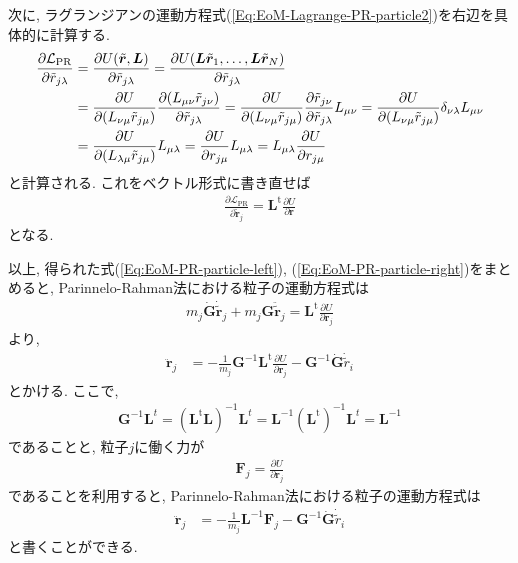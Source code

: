 次に, ラグランジアンの運動方程式(\ref{Eq:EoM-Lagrange-PR-particle2})を右辺を具体的に計算する.
\begin{align}
  \frac{\partial \mathcal{L}_{\mathrm{PR}}}
  {\partial \tilde{r}_{j \lambda}}
&=
\frac{\partial U(\tilde{\bm{r}}, \bm{L})}{\partial \tilde{r}_{j \lambda}}
=
\frac{\partial U (\bm{L}\tilde{\bm{r}}_{1}, \ldots, \bm{L}\tilde{\bm{r}}_{N})}
     {\partial \tilde{r}_{j \lambda}}
\notag \\
&=
\frac{\partial U}{\partial (L_{\nu\mu} \tilde{r}_{j\mu})}
\frac{\partial (L_{\mu\nu} \tilde{r}_{j\nu})}{\partial \tilde{r}_{j \lambda}}
=
\frac{\partial U}{\partial (L_{\nu\mu} \tilde{r}_{j\mu})}
\frac{\partial \tilde{r}_{j\nu}}{\partial \tilde{r}_{j \lambda}}
L_{\mu\nu}
=
\frac{\partial U}{\partial (L_{\nu\mu} \tilde{r}_{j\mu})}
\delta_{\nu\lambda}
L_{\mu\nu}
\notag \\
&=
\frac{\partial U}{\partial (L_{\lambda\mu} \tilde{r}_{j\mu})}
L_{\mu\lambda}
=
\frac{\partial U}{\partial r_{j\mu}}
L_{\mu\lambda}
=
L_{\mu\lambda}
\frac{\partial U}{\partial r_{j\mu}}
\end{align}
と計算される. これをベクトル形式に書き直せば
\begin{align}
  \frac{\partial \mathcal{L}_{\mathrm{PR}}}{\partial \tilde{\bm{r}}_{j}}
  =
  \bm{L}^{\mathrm{t}} \frac{\partial U}{\partial \bm{r}}
  \label{Eq:EoM-PR-particle-right}
\end{align}
となる.


以上, 得られた式(\ref{Eq:EoM-PR-particle-left}), (\ref{Eq:EoM-PR-particle-right})をまとめると, Parinnelo-Rahman法における粒子の運動方程式は
\begin{align}
  m_{j} \dot{\bm{G}} \dot{\tilde{\bm{r}}}_{j}
  +
  m_{j} \bm{G} \ddot{\tilde{\bm{r}}}_{j}
  =
  \bm{L}^{\mathrm{t}} \frac{\partial U}{\partial \bm{r}_{j}}
\end{align}
より, 
\begin{align}
  \ddot{\bm{r}}_{j}
  &=
  -\frac{1}{m_{j}}
  \bm{G}^{-1} \bm{L}^{\mathrm{t}} \frac{\partial U}{\partial \bm{r}_{j}}
  -
  \bm{G}^{-1}\dot{\bm{G}}\dot{\tilde{r}}_{i}
\end{align}
とかける. ここで, 
\begin{align}
  \bm{G}^{-1} \bm{L}^{t}
  =
  (\bm{L}^{\mathrm{t}} \bm{L})^{-1} \bm{L}^{t}
  =
  \bm{L}^{-1} (\bm{L}^{\mathrm{t}})^{-1} \bm{L}^{t}
  =
  \bm{L}^{-1}
\end{align}
であることと, 粒子$j$に働く力が
\begin{align}
  \bm{F}_{j} = \frac{\partial U}{\partial \bm{r}_{j}}
\end{align}
であることを利用すると, Parinnelo-Rahman法における粒子の運動方程式は
\begin{align}
  \ddot{\bm{r}}_{j}
  &=
  -\frac{1}{m_{j}}
  \bm{L}^{-1} \bm{F}_{j}
  -
  \bm{G}^{-1}\dot{\bm{G}}\dot{\tilde{r}}_{i}
\end{align}
と書くことができる.


